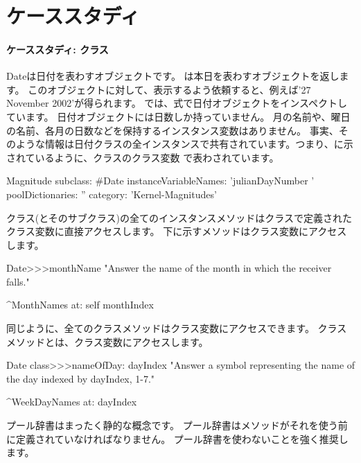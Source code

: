 \documentclass[a4paper,10pt,twoside]{book}
\begin{document}
	\renewcommand{\nnbb}[2]{} %
	\sloppy
\fi


\chapter{ケーススタディ}

\subsubsection{ケーススタディ: クラス}
Dateは日付を表わすオブジェクトです。
は本日を表わすオブジェクトを返します。
このオブジェクトに対して、表示するよう依頼すると、例えば'27 November 2002'が得られます。%
では、式で日付オブジェクトをインスペクトしています。
日付オブジェクトには日数しか持っていません。
月の名前や、曜日の名前、各月の日数などを保持するインスタンス変数はありません。
事実、そのような情報は日付クラスの全インスタンスで共有されています。つまり、に示されているように、クラスのクラス変数 %
で表わされています。

\begin{classdef}{}
Magnitude subclass: \#Date
   instanceVariableNames: 'julianDayNumber '
   poolDictionaries: ''
   category: 'Kernel-Magnitudes'
\end{classdef}


クラス(とそのサブクラス)の全てのインスタンスメソッドはクラスで定義されたクラス変数に直接アクセスします。
下に示すメソッドはクラス変数にアクセスします。

\begin{method}{}
Date>>>monthName
   "Answer the name of the month in which the receiver falls."

   ^MonthNames at: self monthIndex
\end{method}

同じように、全てのクラスメソッドはクラス変数にアクセスできます。
クラスメソッドとは、クラス変数にアクセスします。

\begin{method}{}
Date class>>>nameOfDay: dayIndex 
   "Answer a symbol representing the name of the day indexed by dayIndex, 1-7."

   ^WeekDayNames at: dayIndex
\end{method}


プール辞書はまったく静的な概念です。 %
プール辞書はメソッドがそれを使う前に定義されていなければなりません。%
プール辞書を使わないことを強く推奨します。%

\ifx\wholebook\relax\else
\end{document}
